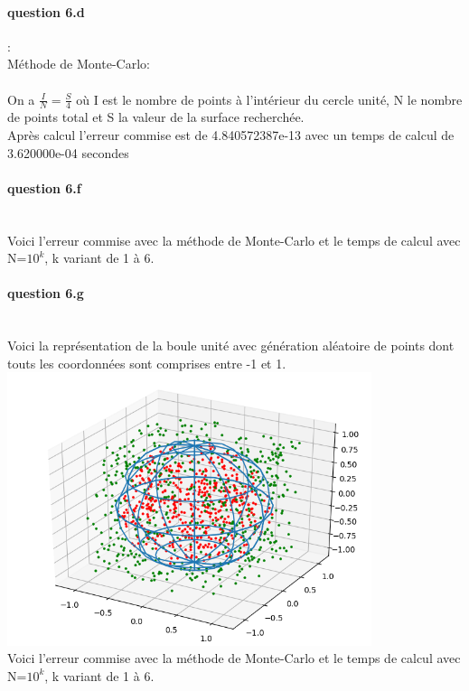 \documentclass{article}
\begin{document}
\paragraph{question 6.d}:
~~\\
Méthode de Monte-Carlo:
\\ \\
On a $\frac{I}{N}= \frac{S}{4}$ où I est le nombre de points à l'intérieur du cercle unité, N le nombre de points total et S la valeur de la surface recherchée.
\\
Après calcul l'erreur commise est de 4.840572387e-13 avec un temps de calcul de 3.620000e-04  secondes
\paragraph{question 6.f}
~~\\
Voici l'erreur commise avec la méthode de Monte-Carlo et le temps de calcul avec N=$10^k$, k variant de 1 à 6. 
\\
\newpage
\paragraph{question 6.g}
~~\\
Voici la représentation de la boule unité avec génération aléatoire de points dont touts les coordonnées sont comprises entre -1 et 1.
\\
\includegraphics[height=8cm]{sphere.png}
\\
Voici l'erreur commise avec la méthode de Monte-Carlo et le temps de calcul avec  N=$10^k$, k variant de 1 à 6. 
\\
\end{document}
